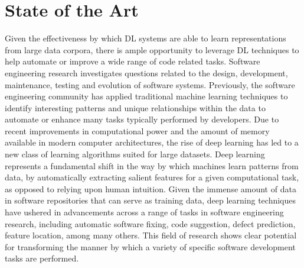 \section{State of the Art}
Given the effectiveness by which DL systems are able to learn representations from large data corpora, there is 
ample opportunity to leverage DL techniques to help automate or improve a wide range of code related tasks. 
Software engineering research investigates questions related to the design, development, maintenance, testing and evolution 
of software systems. Previously, the software engineering community has applied traditional machine learning 
techniques to identify interesting patterns and unique relationships within the data to automate or enhance many tasks typically 
performed by developers. Due to recent improvements in computational power and the amount of memory available 
in modern computer architectures, the rise of deep learning has led to a new class of learning algorithms suited for large datasets.
Deep learning represents a fundamental shift in the way by which machines learn patterns from data, by automatically extracting salient features
for a given computational task, as opposed to relying upon human intuition. Given the immense amount of data in software repositories that 
can serve as training data, deep learning techniques have ushered in advancements across a range of tasks in software engineering research, including
automatic software fixing, code suggestion, defect prediction, feature location, among many others. This field of research shows clear potential for
transforming the manner by which a variety of specific software development tasks are performed.

